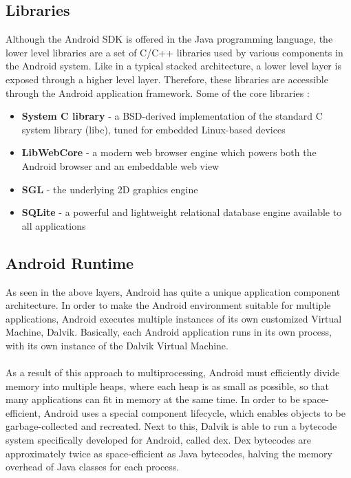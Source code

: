 \subsection{Libraries}

Although the Android SDK is offered in the Java programming language, the lower level libraries are a set of C/C++ libraries used by various components in the Android system. Like in a typical stacked architecture, a lower level layer is exposed through a higher level layer. Therefore, these libraries are accessible through the Android application framework. Some of the core libraries \cite{WhatAndroid}:

\begin{itemize}
\item{\textbf{System C library} - a BSD-derived implementation of the standard C system library (libc), tuned for embedded Linux-based devices}
\item{\textbf{LibWebCore} - a modern web browser engine which powers both the Android browser and an embeddable web view}
\item{\textbf{SGL} - the underlying 2D graphics engine}
\item{\textbf{SQLite} - a powerful and lightweight relational database engine available to all applications}
\end{itemize} 

\subsection{Android Runtime}

As seen in the above layers, Android has quite a unique application component architecture. In order to make the Android environment suitable for multiple applications, Android executes multiple instances of its own customized Virtual Machine, Dalvik. Basically, each Android application runs in its own process, with its own instance of the Dalvik Virtual Machine. 
\\ \\
As a result of this approach to multiprocessing, Android must efficiently divide memory into multiple heaps, where each heap is as small as possible, so that many applications can fit in memory at the same time. In order to be space-efficient, Android uses a special component lifecycle, which enables objects to be garbage-collected and recreated. Next to this, Dalvik is able to run a bytecode system specifically developed for Android, called dex. Dex bytecodes are approximately twice as space-efficient as Java bytecodes, halving the memory overhead of Java classes for each process.


